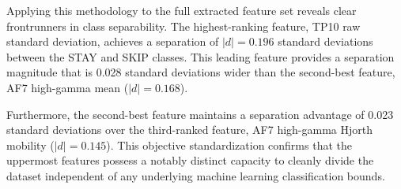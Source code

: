 Applying this methodology to the full extracted feature set reveals clear frontrunners in class separability. The highest-ranking feature, TP10 raw standard deviation, achieves a separation of $|d| = 0.196$ standard deviations between the STAY and SKIP classes. This leading feature provides a separation magnitude that is 0.028 standard deviations wider than the second-best feature, AF7 high-gamma mean ($|d| = 0.168$). 

Furthermore, the second-best feature maintains a separation advantage of 0.023 standard deviations over the third-ranked feature, AF7 high-gamma Hjorth mobility ($|d| = 0.145$). This objective standardization confirms that the uppermost features possess a notably distinct capacity to cleanly divide the dataset independent of any underlying machine learning classification bounds.